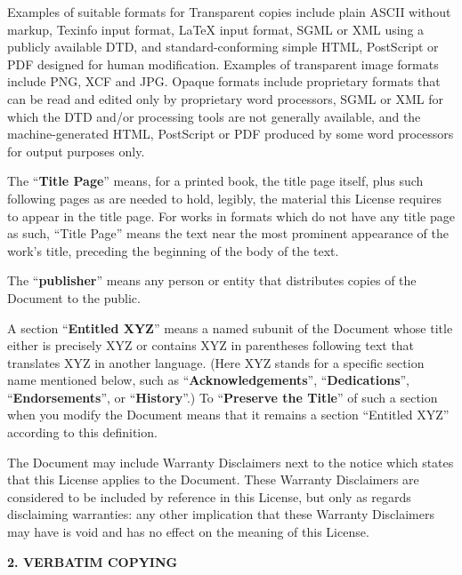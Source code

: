 \documentclass[10pt,a4paper,ngerman,titlepage,tocindentauto]{article}
\begin{document}
\begin{multicols}{3}
{				Examples of suitable formats for Transparent copies include plain
				ASCII without markup, Texinfo input format, LaTeX input format, SGML
				or XML using a publicly available DTD, and standard-conforming simple
				HTML, PostScript or PDF designed for human modification.  Examples of
				transparent image formats include PNG, XCF and JPG.  Opaque formats
				include proprietary formats that can be read and edited only by
				proprietary word processors, SGML or XML for which the DTD and/or
				processing tools are not generally available, and the
				machine-generated HTML, PostScript or PDF produced by some word
				processors for output purposes only.

				The ``\textbf{Title Page}'' means, for a printed book, the title page itself,
				plus such following pages as are needed to hold, legibly, the material
				this License requires to appear in the title page.  For works in
				formats which do not have any title page as such, ``Title Page'' means
				the text near the most prominent appearance of the work's title,
				preceding the beginning of the body of the text.

				The ``\textbf{publisher}'' means any person or entity that distributes
				copies of the Document to the public.

				A section ``\textbf{Entitled XYZ}'' means a named subunit of the Document whose
				title either is precisely XYZ or contains XYZ in parentheses following
				text that translates XYZ in another language.  (Here XYZ stands for a
				specific section name mentioned below, such as ``\textbf{Acknowledgements}'',
				``\textbf{Dedications}'', ``\textbf{Endorsements}'', or ``\textbf{History}''.)  
				To ``\textbf{Preserve the Title}''
				of such a section when you modify the Document means that it remains a
				section ``Entitled XYZ'' according to this definition.

				The Document may include Warranty Disclaimers next to the notice which
				states that this License applies to the Document.  These Warranty
				Disclaimers are considered to be included by reference in this
				License, but only as regards disclaiming warranties: any other
				implication that these Warranty Disclaimers may have is void and has
				no effect on the meaning of this License.


				\begin{center}
				{\bf 2. VERBATIM COPYING\par}
				\end{center}

}
\end{multicols}
\end{document}
